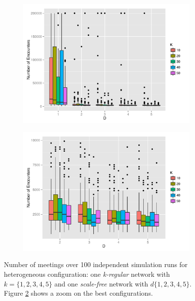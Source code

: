 \documentclass[preprint,number]{elsarticle}
\begin{document}
      \begin{figure}[H]
        \centering
	\begin{subfigure}{.49\linewidth}
          \centering
          \includegraphics[width=1\linewidth]{"../analysis/pdf/context_permeability_encounters_sfreg_k1020304050"}
          \caption{}
          \label{fig:ctx_perm_sfkreg_1020304050full}
	\end{subfigure}%
	\begin{subfigure}{.49\linewidth}
		\centering
		\includegraphics[width=1\linewidth]{"../analysis/pdf/context_permeability_encounters_sfreg_k1020304050_best"}
		\caption{}
		\label{fig:ctx_perm_sfkreg_1020304050best}
              \end{subfigure}
              \begin{minipage}{0.9\linewidth}
		\vspace{0.2cm}
		\caption{Number of meetings over 100 independent simulation runs for heterogeneous
                  configuration: one \textit{k-regular} network with $k=\{1,2,3,4,5\}$ and one
                  \textit{scale-free} network with $d\{1,2,3,4,5\}$. Figure
                  \ref{fig:ctx_perm_sfkreg_1020304050best} shows a zoom on the best configurations.}
		\label{fig:ctx_perm_sfkreg}
              \end{minipage}
      \end{figure}
\end{document}
